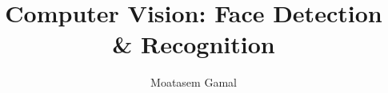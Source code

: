 \documentclass[aspectratio=169]{beamer}
\title{Computer Vision: Face Detection \& Recognition}
\author{Moatasem Gamal}
\institute{FCAI BSU}
\begin{document}
\begin{frame}

\end{frame}
\end{document}
